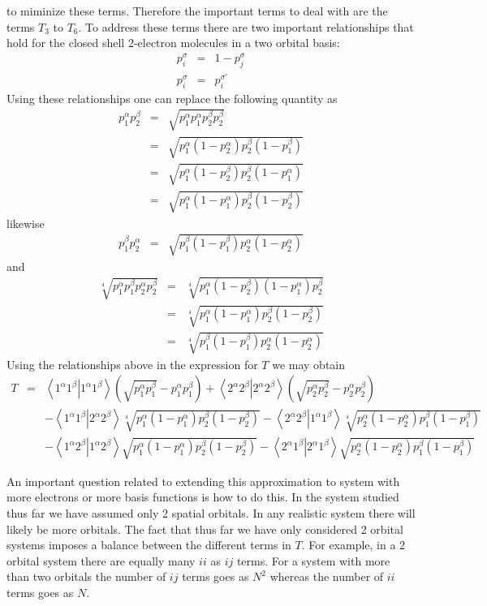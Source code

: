 \documentclass[pra]{revtex4-1}
\newcommand{\eria}[4]{\left\langle #1^\alpha #2^\beta \right.\left| #3^\alpha #4^\beta \right\rangle}
\begin{document}
to miminize these terms. Therefore the important terms to deal with are the terms $T_3$ to $T_6$.
To address these terms there are two important relationships that hold for the closed shell 
2-electron molecules in a two orbital basis:
\begin{eqnarray}
  p_i^\sigma &=& 1-p_j^\sigma \\
  p_i^\sigma &=& p_i^{\sigma'}
\end{eqnarray}
Using these relationships one can replace the following quantity as
\begin{eqnarray}
  p_1^\alpha p_2^\beta 
  &=& \sqrt{p_1^\alpha p_1^\alpha p_2^\beta p_2^\beta} \\
  &=& \sqrt{p_1^\alpha(1-p_2^\alpha)p_2^\beta(1-p_1^\beta)} \\
  &=& \sqrt{p_1^\alpha(1-p_2^\beta)p_2^\beta(1-p_1^\alpha)} \\
  &=& \sqrt{p_1^\alpha(1-p_1^\alpha)p_2^\beta(1-p_2^\beta)}
\end{eqnarray}
likewise
\begin{eqnarray}
  p_1^\beta p_2^\alpha 
  &=& \sqrt{p_1^\beta(1-p_1^\beta)p_2^\alpha(1-p_2^\alpha)}
\end{eqnarray}
and
\begin{eqnarray}
  \sqrt[4]{p_1^\alpha p_1^\beta p_2^\alpha p_2^\beta}
  &=& \sqrt[4]{p_1^\alpha (1-p_2^\beta)(1-p_1^\alpha)p_2^\beta} \\
  &=& \sqrt[4]{p_1^\alpha (1-p_1^\alpha) p_2^\beta (1-p_2^\beta)} \\
  &=& \sqrt[4]{p_1^\beta (1-p_1^\beta) p_2^\alpha (1-p_2^\alpha)}
\end{eqnarray}
Using the relationships above in the expression for $T$ we may obtain
\begin{eqnarray}
   T
   &=& \eria{1}{1}{1}{1} \left(\sqrt{p_1^\alpha p_1^\beta}-p_1^\alpha p_1^\beta\right)
    +  \eria{2}{2}{2}{2} \left(\sqrt{p_2^\alpha p_2^\beta}-p_2^\alpha p_2^\beta\right) \nonumber \\
   &&- \eria{1}{1}{2}{2} \sqrt[4]{p_1^\alpha (1-p_1^\alpha) p_2^\beta (1-p_2^\beta)}
    -  \eria{2}{2}{1}{1} \sqrt[4]{p_2^\alpha (1-p_2^\alpha) p_1^\beta (1-p_1^\beta)} \nonumber \\
   &&- \eria{1}{2}{1}{2} \sqrt{p_1^\alpha (1-p_1^\alpha) p_2^\beta (1-p_2^\beta)}
    -  \eria{2}{1}{2}{1} \sqrt{p_2^\alpha (1-p_2^\alpha) p_1^\beta (1-p_1^\beta)}
   \label{Eq:T_subtract_3}
\end{eqnarray}

An important question related to extending this approximation to system with more
electrons or more basis functions is how to do this. In the system studied thus
far we have assumed only 2 spatial orbitals. In any realistic system there will likely
be more orbitals. The fact that thus far we have only considered 2 orbital systems
imposes a balance between the different terms in $T$. For example, in a 2 orbital system
there are equally many $ii$ as $ij$ terms. For a system with more than two orbitals the
number of $ij$ terms goes as $N^2$ whereas the number of $ii$ terms goes as $N$. 
\end{document}
